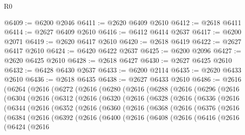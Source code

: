 \begin{lexlean}{R0}
\begin{coremodule}
@6409 := @6200 @2046
@6411 := @2620 @6409 @2610
@6412 := @2618 @6411
@6414 := @2627 @6409 @2610
@6416 := @6412 @6414 @2637
@6417 := @6200 @2071
@6419 := @2620 @6417 @2610
@6420 := @2618 @6419
@6422 := @2627 @6417 @2610
@6424 := @6420 @6422 @2637
@6425 := @6200 @2096
@6427 := @2620 @6425 @2610
@6428 := @2618 @6427
@6430 := @2627 @6425 @2610
@6432 := @6428 @6430 @2637
@6433 := @6200 @2114
@6435 := @2620 @6433 @2610
@6436 := @2618 @6435
@6438 := @2627 @6433 @2610
@6486 := @2616
    (@6264
      (@2616
        (@6272
          (@2616
            (@6280
              (@2616
                (@6288
                  (@2616
                    (@6296
                      (@2616
                        (@6304
                          (@2616
                            (@6312
                              (@2616
                                (@6320
                                  (@2616
                                    (@6328
                                      (@2616
                                        (@6336
                                          (@2616
                                            (@6344
                                              (@2616
                                                (@6352
                                                  (@2616
                                                    (@6360
                                                      (@2616
                                                        (@6368
                                                          (@2616
                                                            (@6376
                                                              (@2616
                                                                (@6384
                                                                  (@2616
                                                                    (@6392
                                                                      (@2616
                                                                        (@6400
                                                                          (@2616
                                                                            (@6408
                                                                              (@2616
                                                                                (@6416
                                                                                  (@2616
                                                                                    (@6424
                                                                                      (@2616

\end{coremodule}
\end{lexlean}

